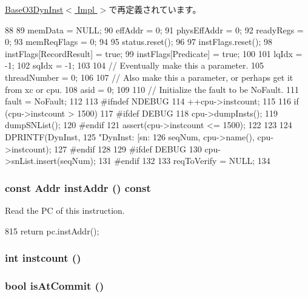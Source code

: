 \hyperlink{classBaseO3DynInst_a1b19937d8cca25bf52a51ae7de67ea94}{BaseO3DynInst$<$ Impl $>$}で再定義されています。


\begin{DoxyCode}
88 {
89     memData = NULL;
90     effAddr = 0;
91     physEffAddr = 0;
92     readyRegs = 0;
93     memReqFlags = 0;
94 
95     status.reset();
96 
97     instFlags.reset();
98     instFlags[RecordResult] = true;
99     instFlags[Predicate] = true;
100 
101     lqIdx = -1;
102     sqIdx = -1;
103 
104     // Eventually make this a parameter.
105     threadNumber = 0;
106 
107     // Also make this a parameter, or perhaps get it from xc or cpu.
108     asid = 0;
109 
110     // Initialize the fault to be NoFault.
111     fault = NoFault;
112 
113 #ifndef NDEBUG
114     ++cpu->instcount;
115 
116     if (cpu->instcount > 1500) {
117 #ifdef DEBUG
118         cpu->dumpInsts();
119         dumpSNList();
120 #endif
121         assert(cpu->instcount <= 1500);
122     }
123 
124     DPRINTF(DynInst,
125         "DynInst: [sn:%
126         seqNum, cpu->name(), cpu->instcount);
127 #endif
128 
129 #ifdef DEBUG
130     cpu->snList.insert(seqNum);
131 #endif
132 
133     reqToVerify = NULL;
134 }
\end{DoxyCode}
\hypertarget{classBaseDynInst_a85879d46d0c22de560215747a6d083af}{
\subsubsection[{instAddr}]{\setlength{\rightskip}{0pt plus 5cm}const {\bf Addr} instAddr () const}}
\label{classBaseDynInst_a85879d46d0c22de560215747a6d083af}
Read the PC of this instruction. 


\begin{DoxyCode}
815 { return pc.instAddr(); }
\end{DoxyCode}
\hypertarget{classBaseDynInst_a19e374b98940ff65bd4d9d17f198738c}{
\subsubsection[{instcount}]{\setlength{\rightskip}{0pt plus 5cm}int instcount ()}}
\label{classBaseDynInst_a19e374b98940ff65bd4d9d17f198738c}
\hypertarget{classBaseDynInst_a8b514343a000efa2bf568c4f964cb8b1}{
\subsubsection[{isAtCommit}]{\setlength{\rightskip}{0pt plus 5cm}bool isAtCommit ()}}
\label{classBaseDynInst_a8b514343a000efa2bf568c4f964cb8b1}



